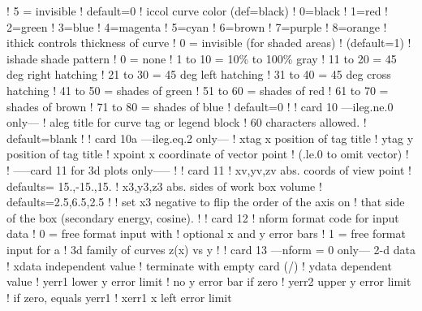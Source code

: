 \begin{ccode}
   !                     5 = invisible
   !                     default=0
   !     iccol         curve color (def=black)
   !                     0=black
   !                     1=red
   !                     2=green
   !                     3=blue
   !                     4=magenta
   !                     5=cyan
   !                     6=brown
   !                     7=purple
   !                     8=orange
   !     ithick        controls thickness of curve
   !                     0 = invisible (for shaded areas)
   !                     (default=1)
   !     ishade        shade pattern
   !                     0 = none
   !                     1 to 10 = 10\% to 100\% gray
   !                     11 to 20 = 45 deg right hatching
   !                     21 to 30 = 45 deg left hatching
   !                     31 to 40 = 45 deg cross hatching
   !                     41 to 50 = shades of green
   !                     51 to 60 = shades of red
   !                     61 to 70 = shades of brown
   !                     71 to 80 = shades of blue
   !                     default=0
   !
   !   card 10   ---ileg.ne.0 only---
   !     aleg          title for curve tag or legend block
   !                   60 characters allowed.
   !                   default=blank
   !
   !   card 10a  ---ileg.eq.2 only---
   !     xtag          x position of tag title
   !     ytag          y position of tag title
   !     xpoint        x coordinate of vector point
   !                    (.le.0 to omit vector)
   !
   ! -----card 11 for 3d plots only-----
   !
   !   card 11
   !     xv,yv,zv      abs. coords of view point
   !                   defaults= 15.,-15.,15.
   !     x3,y3,z3      abs. sides of work box volume
   !                   defaults=2.5,6.5,2.5
   !
   !          set x3 negative to flip the order of the axis on
   !          that side of the box (secondary energy, cosine).
   !
   !   card 12
   !     nform          format code for input data
   !                    0 = free format input with
   !                        optional x and y error bars
   !                    1 = free format input for a
   !                        3d family of curves z(x) vs y
   !
   !   card 13   ---nform = 0 only---   2-d data
   !     xdata          independent value
   !                    terminate with empty card (/)
   !     ydata          dependent value
   !     yerr1          lower y error limit
   !                    no y error bar if zero
   !     yerr2          upper y error limit
   !                    if zero, equals yerr1
   !     xerr1          x left error limit

\end{ccode}

